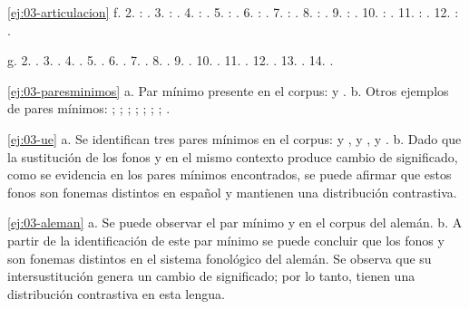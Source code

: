 \begin{solucion}{\ref{ej:03-articulacion}}
f. 2. : . 3. : . 4.
: . 5. : . 6. :
. 7. : . 8. : . 9. :
. 10. : . 11. : . 12.
: .

g. 2.  . 3.  . 4. 
. 5.  . 6.  .
7.  . 8.  . 9. 
. 10.  . 11.  .
12.  . 13.  . 14.
 .
\end{solucion}

\begin{solucion}{\ref{ej:03-paresminimos}}
a. Par mínimo presente en el corpus:  y . b. Otros
ejemplos de pares mínimos:  ;  ; 
;  ;  ; 
;  ;  .
\end{solucion}

\begin{solucion}{\ref{ej:03-ue}}
a. Se identifican tres pares mínimos en el corpus:   y
 ,   y  ,
  y  . b. Dado que la
sustitución de los fonos  y  en el mismo contexto produce cambio
de significado, como se evidencia en los pares mínimos encontrados, se puede
afirmar que estos fonos son fonemas distintos en español y mantienen una
distribución contrastiva.
\end{solucion}

\begin{solucion}{\ref{ej:03-aleman}}
a. Se puede observar el par mínimo   y
  en el corpus del alemán. b. A partir de la
identificación de este par mínimo se puede concluir que los fonos  y
 son fonemas distintos en el sistema fonológico del alemán. Se observa
que su intersustitución genera un cambio de significado; por lo tanto, tienen
una distribución contrastiva en esta lengua.
\end{solucion}

